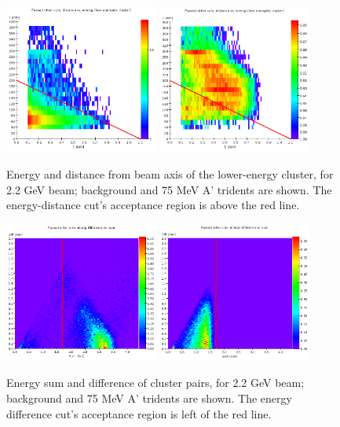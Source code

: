 \begin{figure}[ht]
	\includegraphics[width=0.45\textwidth]{performance/trigger/energy-distance_22}
	\includegraphics[width=0.45\textwidth]{performance/trigger/energy-distance_22_075mev}
	\caption{\small{Energy and distance from beam axis of the lower-energy cluster, for 2.2 GeV beam; background and 75 MeV A' tridents are shown. The energy-distance cut's acceptance region is above the red line.}}
	\label{fig:energy-distance}
\end{figure}

\begin{figure}[ht]
	\includegraphics[width=0.45\textwidth]{performance/trigger/ediff_22}
	\includegraphics[width=0.45\textwidth]{performance/trigger/ediff_22_075mev}
	\caption{\small{Energy sum and difference of cluster pairs, for 2.2 GeV beam; background and 75 MeV A' tridents are shown. The energy difference cut's acceptance region is left of the red line.}}
	\label{fig:ediff}
\end{figure}

